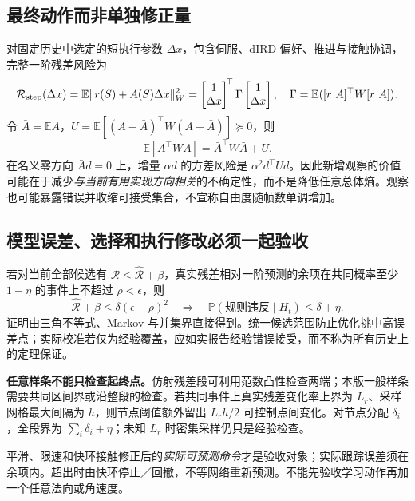 \documentclass[UTF8,fontset=fandol,11pt,a4paper]{ctexart}
\theoremstyle{plain}
\theoremstyle{definition}
\theoremstyle{remark}
\numberwithin{equation}{section}
\newcommand{\E}{\mathbb E}
\newcommand{\Prob}{\mathbb P}
\begin{document}
\subsection{最终动作而非单独修正量}
对固定历史中选定的短执行参数 $\Delta x$，包含伺服、dIRD 偏好、推进与接触协调，完整一阶残差风险为
\begin{equation}
\mathcal R_{\rm step}(\Delta x)=\E\|r(S)+A(S)\Delta x\|_W^2
=\begin{bmatrix}1\\\Delta x\end{bmatrix}^{\!\top}
\Gamma\begin{bmatrix}1\\\Delta x\end{bmatrix},
\quad\Gamma=\E([r\ A]^\top W[r\ A]).
\label{eq:risk}
\end{equation}
令 $\bar A=\E A$，$U=\E[(A-\bar A)^\top W(A-\bar A)]\succeq0$，则
\begin{equation}
\E[A^\top WA]=\bar A^\top W\bar A+U.
\end{equation}
在名义零方向 $\bar A d=0$ 上，增量 $\alpha d$ 的方差风险是 $\alpha^2d^\top Ud$。因此新增观察的价值可能在于减少\emph{与当前有用实现方向相关}的不确定性，而不是降低任意总体熵。观察也可能暴露错误并收缩可接受集合，不宣称自由度随帧数单调增加。

\subsection{模型误差、选择和执行修改必须一起验收}
若对当前全部候选有 $\mathcal R\le\widehat{\mathcal R}+\beta$，真实残差相对一阶预测的余项在共同概率至少 $1-\eta$ 的事件上不超过 $\rho<\epsilon$，则
\begin{equation}
\widehat{\mathcal R}+\beta\le\delta(\epsilon-\rho)^2
\quad\Longrightarrow\quad
\Prob(\text{规则违反}\mid H_t)\le\delta+\eta.
\label{eq:chance}
\end{equation}
证明由三角不等式、Markov 与并集界直接得到。统一候选范围防止优化挑中高误差点；实际校准若仅为经验覆盖，应如实报告经验错误接受，而不称为所有历史上的定理保证。

\textbf{任意样条不能只检查起终点。}仿射残差段可利用范数凸性检查两端；本版一般样条需要共同区间界或沿整段的检查。若共同事件上真实残差变化率上界为 $L_r$、采样网格最大间隔为 $h$，则节点阈值额外留出 $L_rh/2$ 可控制点间变化。对节点分配 $\delta_i$，全段界为 $\sum_i\delta_i+\eta$；未知 $L_r$ 时密集采样仍只是经验检查。

平滑、限速和快环接触修正后的\emph{实际可预测命令}才是验收对象；实际跟踪误差须在余项内。超出时由快环停止／回撤，不等网络重新预测。不能先验收学习动作再加一个任意法向或角速度。
\end{document}
